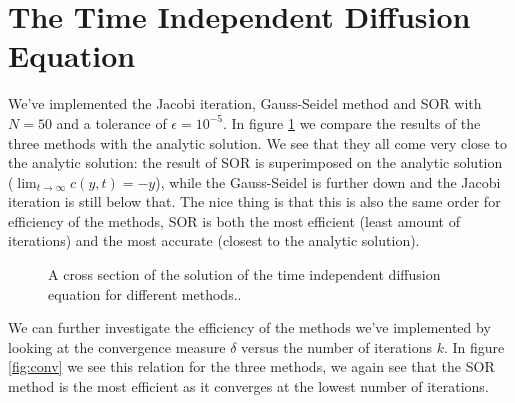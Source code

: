 \documentclass[a4paper]{article}
\begin{document}
\section{The Time Independent Diffusion Equation}
We've implemented the Jacobi iteration, Gauss-Seidel method and SOR with $N=50$ and a tolerance of $\epsilon = 10^{-5}$. In figure \ref{fig:time_ind} we compare the results of the three methods with the analytic solution. We see that they all come very close to the analytic solution: the result of SOR is superimposed on the analytic solution ($\lim_{t \to \infty} c(y, t)=-y$), while the Gauss-Seidel is further down and the Jacobi iteration is still below that. The nice thing is that this is also the same order for efficiency of the methods, SOR is both the most efficient (least amount of iterations) and the most accurate (closest to the analytic solution).

\begin{figure}
\caption{A cross section of the solution of the time independent diffusion equation for different methods..}
\label{fig:time_ind}
\end{figure}

We can further investigate the efficiency of the methods we've implemented by looking at the convergence measure $\delta$ versus the number of iterations $k$. In figure \ref{fig:conv} we see this relation for the three methods, we again see that the SOR method is the most efficient as it converges at the lowest number of iterations.
\end{document}
